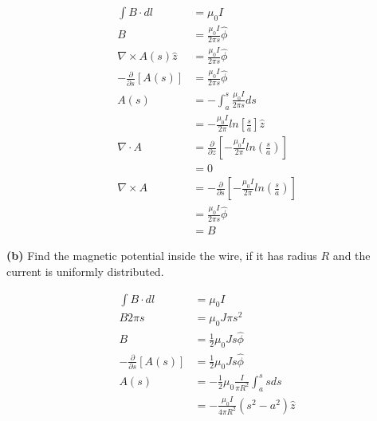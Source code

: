 \documentclass{article}
\begin{document}
\begin{equation*}
\begin{split}
	\int B \cdot dl & = \mu_0 I \\
	B & = \frac{\mu_0 I}{2 \pi s} \hat{\phi} \\
	\nabla \times A(s) \hat{z} & = \frac{\mu_0 I}{2 \pi s} \hat{\phi} \\
	- \frac{\partial}{\partial s} [A(s)] & = \frac{\mu_0 I}{2 \pi s} \hat{\phi} \\
	A(s) & = - \int_a^s \frac{\mu_0 I}{2 \pi s} ds \\
	& = \boxed{- \frac{\mu_0 I}{2 \pi} ln[\frac{s}{a}] \hat{z}} \\
	\nabla \cdot A & = \frac{\partial}{\partial z} [- \frac{\mu_0 I}{2 \pi} ln(\frac{s}{a})] \\
	& = 0 \\
	\nabla \times A & = - \frac{\partial}{\partial s} [- \frac{\mu_0 I}{2 \pi} ln(\frac{s}{a})] \\
	& = \frac{\mu_0 I}{2 \pi s} \hat{\phi} \\
	& = B
\end{split}
\end{equation*}

\textbf{(b)}
Find the magnetic potential inside the wire, if it has radius $R$ and the current is uniformly distributed.

\begin{equation*}
\begin{split}
	\int B \cdot dl & = \mu_0 I \\
	B 2 \pi s & = \mu_0 J \pi s^2 \\
	B & = \frac{1}{2} \mu_0 J s \hat{\phi} \\
	- \frac{\partial}{\partial s} [A(s)] & = \frac{1}{2} \mu_0 J s \hat{\phi} \\
	A(s) & = - \frac{1}{2} \mu_0 \frac{I}{\pi R^2} \int_a^s s ds \\
	& = \boxed{- \frac{\mu_0 I}{4 \pi R^2} (s^2 - a^2) \hat{z}}
\end{split}
\end{equation*}
\end{document}
